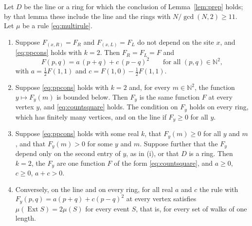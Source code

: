 \begin{theorem}\label{thm:posprod}
Let $D$ be the line or a ring for which the conclusion of Lemma~\ref{lem:prep} holds; by that lemma these include the line and the rings with $N/\gcd(N,2)\ge11$. Let $\mu$ be a rule \eqref{eq:multirule}.
\begin{enumerate}[label=(\roman*)]
\item Suppose $F_{(x,R)}=F_R$ and $F_{(x,L)}=F_L$ do not depend on the site $x$, and \eqref{eq:ppcons} holds with $k=2$. Then $F_R=F_L=F$ and
\begin{equation}\label{eq:countsquare}
F(p,q)=a\,(p+q)+c\,(p-q)^2\qquad\text{for all }(p,q)\in\mathbb{N}^2,
\end{equation}
with $a=\tfrac12F(1,1)$ and $c=F(1,0)-\tfrac12F(1,1)$.
\item Suppose \eqref{eq:ppcons} holds with $k=2$ and, for every $m\in\mathbb{N}^2$, the function $y\mapsto F_y(m)$ is bounded below. Then $F_y$ is the same function $F$ at every vertex $y$, and \eqref{eq:countsquare} holds. The condition on $F_y$ holds on every ring, which has finitely many vertices, and on the line if $F_y\ge0$ for all $y$.
\item Suppose \eqref{eq:ppcons} holds with some real $k$, that $F_y(m)\ge0$ for all $y$ and $m$, and that $F_y(m)>0$ for some $y$ and $m$. Suppose further that the $F_y$ depend only on the second entry of $y$, as in (i), or that $D$ is a ring. Then $k=2$, the $F_y$ are one function $F$ of the form \eqref{eq:countsquare}, and $a\ge0$, $c\ge0$, $a+c>0$.
\item Conversely, on the line and on every ring, for all real $a$ and $c$ the rule with $F_y(p,q)=a(p+q)+c(p-q)^2$ at every vertex satisfies $\mu(\operatorname{Ext}S)=2\mu(S)$ for every event $S$, that is, for every set of walks of one length.
\end{enumerate}
\end{theorem}

